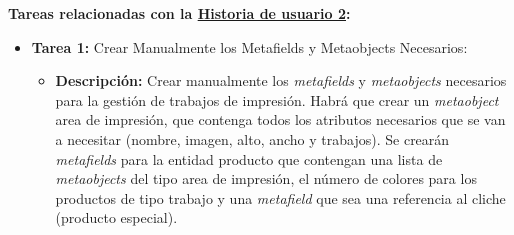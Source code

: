 \documentclass[11pt]{article}
\begin{document}
\textbf{Tareas relacionadas con la \hyperref[sec:historia2]{Historia de usuario 2}:}
\begin{itemize}
    \item \textbf{Tarea 1:} Crear Manualmente los Metafields y Metaobjects Necesarios:
          \begin{itemize}[label=--]
              \item \textbf{Descripción:} Crear manualmente los \textit{metafields} y \textit{metaobjects} necesarios para la gestión de trabajos de impresión. Habrá que crear un \textit{metaobject} area de impresión, que contenga todos los atributos necesarios que se van a necesitar (nombre, imagen, alto, ancho y trabajos). Se crearán \textit{metafields} para la entidad producto que contengan una lista de \textit{metaobjects} del tipo area de impresión, el número de colores para los productos de tipo trabajo y una \textit{metafield} que sea una referencia al cliche (producto especial).
          \end{itemize}
\end{itemize}
\end{document}
